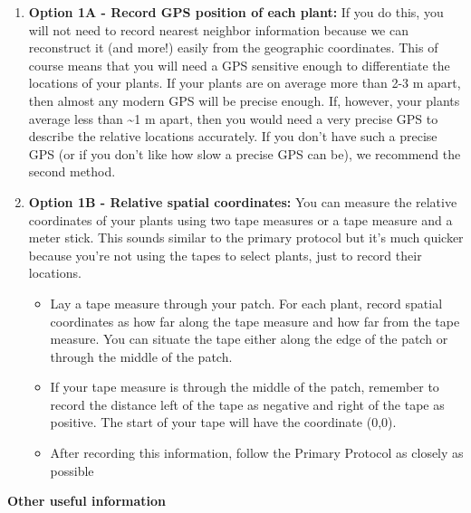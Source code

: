 \documentclass[
  letterpaper,
  oneside,
  open=any]{scrbook}
\begin{document}
\begin{enumerate}
\def\labelenumi{\arabic{enumi})}
\item
  \textbf{Option 1A - Record GPS position of each plant: }If you do
  this, you will not need to record nearest neighbor information because
  we can reconstruct it (and more!) easily from the geographic
  coordinates. This of course means that you will need a GPS sensitive
  enough to differentiate the locations of your plants. If your plants
  are on average more than 2-3 m apart, then almost any modern GPS will
  be precise enough. If, however, your plants average less than
  \textasciitilde1 m apart, then you would need a very precise GPS to
  describe the relative locations accurately. If you don't have such a
  precise GPS (or if you don't like how slow a precise GPS can be), we
  recommend the second method.
\item
  \textbf{Option 1B - Relative spatial coordinates: } You can measure
  the relative coordinates of your plants using two tape measures or a
  tape measure and a meter stick. This sounds similar to the primary
  protocol but it's much quicker because you're not using the tapes to
  select plants, just to record their locations.

  \begin{itemize}
  \item
    Lay a tape measure through your patch. For each plant, record
    spatial coordinates as how far along the tape measure and how far
    from the tape measure. You can situate the tape either along the
    edge of the patch or through the middle of the patch.
  \item
    If your tape measure is through the middle of the patch, remember to
    record the distance left of the tape as negative and right of the
    tape as positive. The start of your tape will have the coordinate
    (0,0).
  \item
    After recording this information, follow the Primary Protocol as
    closely as possible
  \end{itemize}
\end{enumerate}

\textbf{Other useful information}
\end{document}
